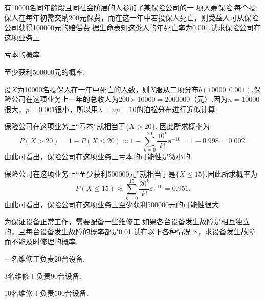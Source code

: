 \begin{solution}
  有10000名同年龄段且同社会阶层的人参加了某保险公司的一
项人寿保险.每个投保人在每年初需交纳200元保费，而在这一年中若投保人死亡，则受益人可从保险公司获得100000元的赔偿费.据生命表知这类人的年死亡率为0.001.试求保险公司在这项业务上

  \begin{inparaenum}[(1)]
    \item 亏本的概率.

    \item 至少获利500000元的概率.
  \end{inparaenum}
\end{solution}

\begin{solution}
  设$X$为10000名投保人在一年中死亡的人数，则$X$服从二项分布$b(10000,0.001)$.保险公司在这项业务上一年的总收人为$200\times10000=
2000000$（元）.因为$n=10000$很大，$p=0.001$很小，所以用$\lambda=np=10$的泊松分布进行近似计算.

\begin{inparaenum}[(1)]
  \item 保险公司在这项业务上“亏本”就相当于$\{X>20\}$. 因此所求概率为
      \[
        P(X > 20) = 1 - P(X \le 20) \approx 1 - \sum_{k=0}^{20} \frac{10^k}{k!}\ee^{-10} = 1 - 0.998 = 0.002.
      \]
      由此可看出，保险公司在这项业务上亏本的可能性是微小的.

  \item 保险公司在这项业务上“至少获利500000元”就相当于是$\{X\le15\}$.因此所求概率为
      \[
        P(X \le 15) \approx \sum_{k=0}^{15} \frac{20^k}{k!}\ee^{-10} = 0.951.
      \]
      由此可看出，保险公司在这项业务上至少获利500000元的可能性很大.
\end{inparaenum}
\end{solution}

\begin{example}
  为保证设备正常工作，需要配备一些维修工.如果各台设备发生故障是相互独立的，且每台设备发生故障的概率都是0.01.试在以下各种情况下，求设备发生故障而不能及时修理的概率.

  \begin{inparaenum}[(1)]
    \item\label{ex2.4.8.1} 一名维修工负责20台设备.

    \item\label{ex2.4.8.2} 3名维修工负责90台设备.

    \item 10名维修工负责500台设备.
  \end{inparaenum}
\end{example}

